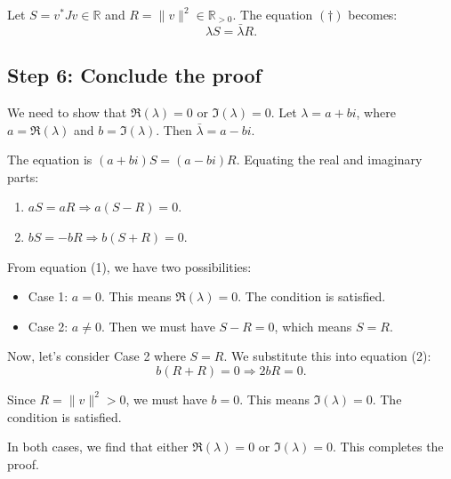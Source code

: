 \documentclass[12pt,a4paper]{article}
\theoremstyle{definition}
\begin{document}
        Let $S = v^*Jv \in \mathbb{R}$ and $R = \|v\|^2 \in \mathbb{R}_{>0}$. The equation $(\dagger)$ becomes:
        \[ \lambda S = \bar{\lambda} R. \]

        \subsection*{Step 6: Conclude the proof}

        We need to show that $\Re(\lambda) = 0$ or $\Im(\lambda) = 0$. Let $\lambda = a+bi$, where $a = \Re(\lambda)$ and $b = \Im(\lambda)$. Then $\bar{\lambda} = a-bi$.

        The equation is $(a+bi)S = (a-bi)R$.
        Equating the real and imaginary parts:
        \begin{enumerate}
            \item $aS = aR \Rightarrow a(S-R) = 0$.
            \item $bS = -bR \Rightarrow b(S+R) = 0$.
        \end{enumerate}

        From equation (1), we have two possibilities:
        \begin{itemize}
            \item Case 1: $a = 0$. This means $\Re(\lambda)=0$. The condition is satisfied.
            \item Case 2: $a \neq 0$. Then we must have $S-R=0$, which means $S=R$.
        \end{itemize}

        Now, let's consider Case 2 where $S=R$. We substitute this into equation (2):
        \[ b(R+R) = 0 \Rightarrow 2bR = 0. \]

        Since $R = \|v\|^2 > 0$, we must have $b=0$. This means $\Im(\lambda)=0$. The condition is satisfied.

        In both cases, we find that either $\Re(\lambda)=0$ or $\Im(\lambda)=0$. This completes the proof.
\end{document}
